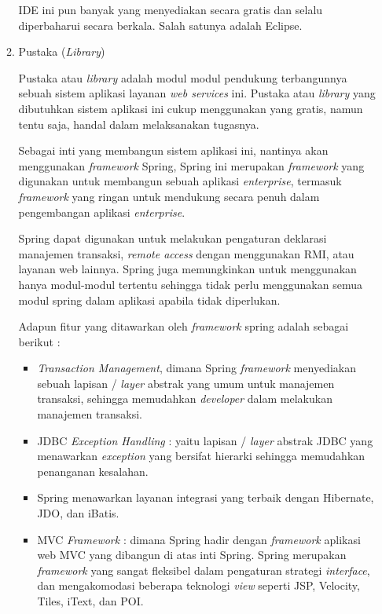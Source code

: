 \documentclass[pdftex,12pt, oneside]{article}
\begin{document}
\begin{enumerate}
\begin{enumerate}
  IDE ini pun banyak yang menyediakan secara gratis dan selalu diperbaharui secara berkala. Salah satunya adalah Eclipse.
  
  \item Pustaka (\textit{Library})
  
  Pustaka atau \textit{library} adalah modul modul pendukung terbangunnya sebuah sistem aplikasi layanan \textit{web services} ini. Pustaka atau \textit{library} yang dibutuhkan sistem aplikasi ini cukup menggunakan yang gratis, namun tentu saja, handal dalam melaksanakan tugasnya.
  
  Sebagai inti yang membangun sistem aplikasi ini, nantinya akan menggunakan \textit{framework} Spring, Spring ini merupakan \textit{framework} yang digunakan untuk membangun sebuah aplikasi \textit{enterprise}, termasuk \textit{framework} yang ringan untuk mendukung secara penuh dalam pengembangan aplikasi \textit{enterprise}.
  
  Spring dapat digunakan untuk melakukan pengaturan deklarasi manajemen transaksi, \textit{remote access} dengan menggunakan RMI, atau layanan web lainnya. Spring juga memungkinkan untuk menggunakan hanya modul-modul tertentu sehingga tidak perlu menggunakan semua modul spring dalam aplikasi apabila tidak diperlukan.
  
  Adapun fitur yang ditawarkan oleh \textit{framework} spring adalah sebagai berikut :
  
  \begin{itemize}
    \item \textit{Transaction Management}, dimana Spring \textit{framework} menyediakan sebuah lapisan / \textit{layer} abstrak yang umum untuk manajemen transaksi, sehingga memudahkan \textit{developer} dalam melakukan manajemen transaksi.
    \item JDBC \textit{Exception Handling} : yaitu lapisan / \textit{layer} abstrak JDBC yang menawarkan \textit{exception} yang bersifat hierarki sehingga memudahkan penanganan kesalahan.
    \item Spring menawarkan layanan integrasi yang terbaik dengan Hibernate, JDO, dan iBatis.
    \item MVC \textit{Framework} : dimana Spring hadir dengan \textit{framework} aplikasi web MVC yang dibangun di atas inti Spring. Spring merupakan \textit{framework} yang sangat fleksibel dalam pengaturan strategi \textit{interface}, dan mengakomodasi beberapa teknologi \textit{view} seperti JSP, Velocity, Tiles, iText, dan POI.
  \end{itemize}
  

\end{enumerate}
\end{enumerate}
\end{document}
